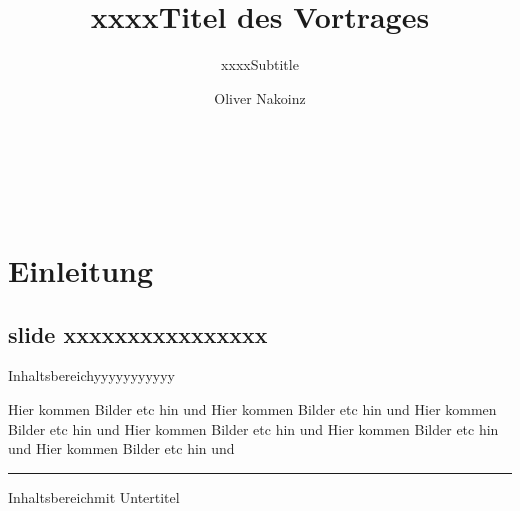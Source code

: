 \documentclass[ngerman,math,12pt, t, dvipsnames, aspectratio=1610]{beamer}
\title{xxxxTitel des Vortrages}
\subtitle{xxxxSubtitle}
\author{Oliver Nakoinz}
\institute{JMA}
\date{}
\begin{document}
\begin{frame}
    \vspace*{-2em}
    \titlepage  
    \vspace*{-2em}
    
    \vspace*{-4em}
    \begin{columns}
        
         \\
        \vspace*{2em}
        \hspace*{2em}
        \tableofcontents[currentsection]
        
        \\
        \vspace*{2em}
        \hspace*{0em}
        
    \end{columns}
\end{frame}



\section{Einleitung}
\subsection*{slide xxxxxxxxxxxxxxxx}
\begin{frame}{Inhaltsbereichyyyyyyyyyyy}
  
Hier kommen Bilder etc hin und
Hier kommen Bilder etc hin und
Hier kommen Bilder etc hin und
Hier kommen Bilder etc hin und
Hier kommen Bilder etc hin und
Hier kommen Bilder etc hin und

\hrule

\end{frame}

\begin{frame}{Inhaltsbereich}{mit Untertitel}
\end{frame}
\end{document}
